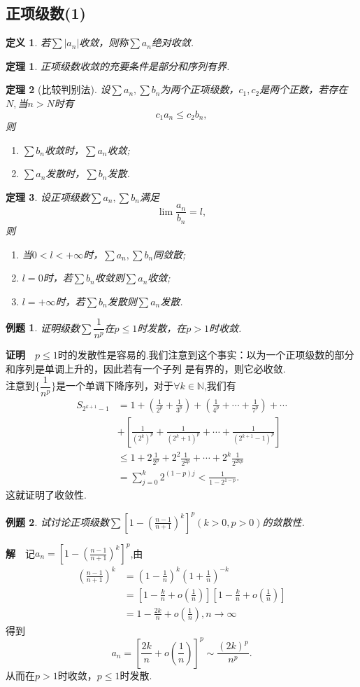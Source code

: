 \documentclass[UTF8]{article}
\newcommand{\zm}{\textbf{证明}$\quad$}
\newcommand{\jie}{\textbf{解}$\quad$}
\newtheorem{thm}{\hspace{2em}定理}[section]
\newtheorem{dfn}{\hspace{2em}定义}[section]
\newtheorem{exa}{\hspace{2em}例题}[section]
\begin{document}
\subsection{正项级数(1)}
\begin{dfn}
  若$\sum|a_n|$收敛，则称$\sum a_n$绝对收敛.
\end{dfn}
\begin{thm}
  正项级数收敛的充要条件是部分和序列有界.
\end{thm}
\begin{thm}[比较判别法]
  设$\sum a_n,\sum b_n$为两个正项级数，$c_1,c_2$是两个正数，若存在$N,$当$n>N$时有$$c_1a_n\le c_2b_n,$$
  则
  \begin{enumerate}
    \item $\sum b_n$收敛时，$\sum a_n$收敛;
    \item $\sum a_n$发散时，$\sum b_n$发散.
  \end{enumerate}
\end{thm}
\begin{thm}
  设正项级数$\sum a_n,\sum b_n$满足
  $$\lim\frac{a_n}{b_n}=l,$$
  则
  \begin{enumerate}
    \item 当$0<l<+\infty$时，$\sum a_n,\sum b_n$同敛散;
    \item $l=0$时，若$\sum b_n$收敛则$\sum a_n$收敛;
    \item $l=+\infty$时，若$\sum b_n$发散则$\sum a_n$发散.
  \end{enumerate}
\end{thm}
\begin{exa}
  证明级数$\sum\dfrac{1}{n^p}$在$p\le1$时发散，在$p>1$时收敛.
\end{exa}
\zm $p\le1$时的发散性是容易的.我们注意到这个事实：以为一个正项级数的部分和序列是单调上升的，因此若有一个子列
是有界的，则它必收敛.\\
注意到$\{\dfrac{1}{n^p}\}$是一个单调下降序列，对于$\forall k\in\mathbb{N}$,我们有
\begin{align*}
  S_{2^{k+1}-1}&=1+(\frac{1}{2^p}+\frac{1}{3^p})+(\frac{1}{4^p}+\cdots+\frac{1}{7^p})+\cdots\\
  &+[\frac{1}{(2^k)^p}+\frac{1}{(2^k+1)^p}+\cdots+\frac{1}{(2^{k+1}-1)^p}]\\
  &\le1+2\frac{1}{2^p}+2^2\frac{1}{2^{2p}}+\cdots+2^k\frac{1}{2^{2kp}}\\
  &=\sum_{j=0}^k2^{(1-p)j}<\frac{1}{1-2^{1-p}}.
\end{align*}
这就证明了收敛性.
\begin{exa}
  试讨论正项级数$\sum[1-(\frac{n-1}{n+1})^k]^p(k>0,p>0)$的敛散性.
\end{exa}
\jie 记$a_n=[1-(\frac{n-1}{n+1})^k]^p$,由
\begin{align*}
  (\frac{n-1}{n+1})^k&=(1-\frac{1}{n})^k(1+\frac{1}{n})^{-k}\\
  &=[1-\frac{k}{n}+o(\frac{1}{n})][1-\frac{k}{n}+o(\frac{1}{n})]\\
  &=1-\frac{2k}{n}+o(\frac{1}{n}),n\to\infty
\end{align*}
得到
$$a_n=[\frac{2k}{n}+o(\frac{1}{n})]^p\sim\frac{(2k)^p}{n^p}.$$
从而在$p>1$时收敛，$p\le1$时发散.
\clearpage
\end{document}
